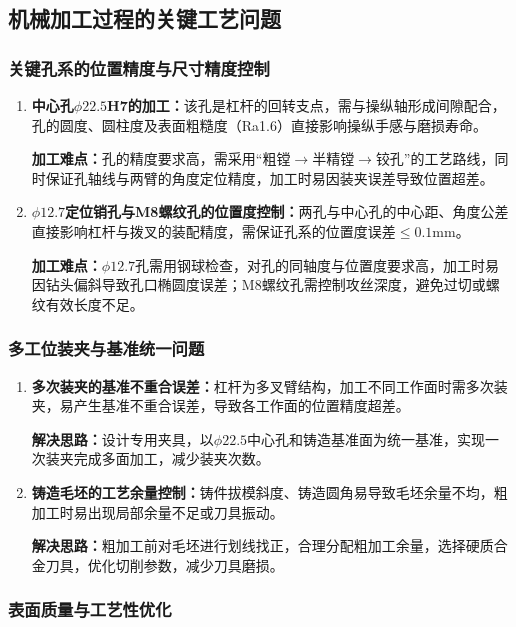 \documentclass[12pt,a4paper,fontset=none]{ctexart}
\begin{document}
    \subsection{机械加工过程的关键工艺问题}

    \subsubsection{关键孔系的位置精度与尺寸精度控制}

    \begin{enumerate}
        \item \textbf{中心孔$\phi22.5$H7的加工：}该孔是杠杆的回转支点，需与操纵轴形成间隙配合，孔的圆度、圆柱度及表面粗糙度（Ra1.6）直接影响操纵手感与磨损寿命。

        \textbf{加工难点：}孔的精度要求高，需采用“粗镗$\rightarrow$半精镗$\rightarrow$铰孔”的工艺路线，同时保证孔轴线与两臂的角度定位精度，加工时易因装夹误差导致位置超差。
        \item \textbf{$\phi12.7$定位销孔与M8螺纹孔的位置度控制：}两孔与中心孔的中心距、角度公差直接影响杠杆与拨叉的装配精度，需保证孔系的位置度误差$\leq 0.1$mm。

        \textbf{加工难点：}$\phi12.7$孔需用钢球检查，对孔的同轴度与位置度要求高，加工时易因钻头偏斜导致孔口椭圆度误差；M8螺纹孔需控制攻丝深度，避免过切或螺纹有效长度不足。
    \end{enumerate}

    \subsubsection{多工位装夹与基准统一问题}

    \begin{enumerate}
        \item \textbf{多次装夹的基准不重合误差：}杠杆为多叉臂结构，加工不同工作面时需多次装夹，易产生基准不重合误差，导致各工作面的位置精度超差。

        \textbf{解决思路：}设计专用夹具，以$\phi22.5$中心孔和铸造基准面为统一基准，实现一次装夹完成多面加工，减少装夹次数。
        \item \textbf{铸造毛坯的工艺余量控制：}铸件拔模斜度、铸造圆角易导致毛坯余量不均，粗加工时易出现局部余量不足或刀具振动。

        \textbf{解决思路：}粗加工前对毛坯进行划线找正，合理分配粗加工余量，选择硬质合金刀具，优化切削参数，减少刀具磨损。
    \end{enumerate}

    \subsubsection{表面质量与工艺性优化}
\end{document}
